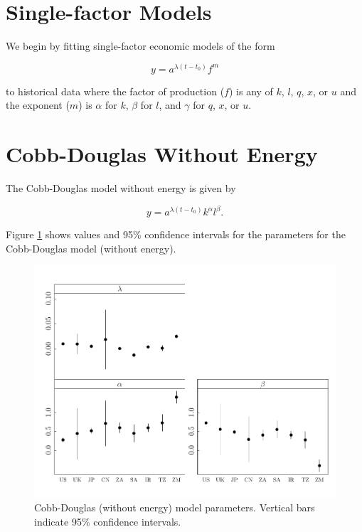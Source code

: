 \documentclass[preprint,authoryear,12pt]{elsarticle}\usepackage{graphicx, color}
\makeatletter
\def\maxwidth{ %
  \ifdim\Gin@nat@width>\linewidth
    \linewidth
  \else
    \Gin@nat@width
  \fi
}
\newenvironment{knitrout}{}{} %
\makeatother
\begin{document}
\section{Single-factor Models}




We begin by fitting single-factor economic models of the form

\begin{equation} \label{eq:Single_Factor_Generic}
  y = a^{\lambda (t-t_0)}f^{m}
\end{equation}

\noindent to historical data where the factor of production ($f$) is any of $k$, $l$, $q$, $x$, or $u$ and the exponent ($m$) is $\alpha$ for $k$, $\beta$ for $l$, and $\gamma$ for $q$, $x$, or $u$.


\section{Cobb-Douglas Without Energy}




The Cobb-Douglas model without energy is given by

\begin{equation} \label{eq:CD_No_Energy}
  y = a^{\lambda (t-t_0)}k^{\alpha}l^{\beta}.
\end{equation}

Figure \ref{fig:CD_Params_Graph} shows values and 95\% confidence intervals for the parameters for the Cobb-Douglas model (without energy).

\begin{knitrout}
\color{fgcolor}\begin{figure}[H]

\includegraphics[width=\maxwidth]{figure/CD_Params_Graph} \caption[Cobb-Douglas (without energy) model parameters]{Cobb-Douglas (without energy) model parameters. Vertical bars indicate 95\% confidence intervals.\label{fig:CD_Params_Graph}}
\end{figure}


\end{knitrout}
\end{document}
